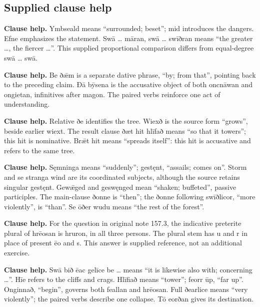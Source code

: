 \subsection*{Supplied clause help}

\textbf{Clause help.} Ymbseald means “surrounded; beset”; mid introduces the dangers. Efne emphasizes the statement. Swā … māran, swā … swīðran means “the greater …, the fiercer …”. This supplied proportional comparison differs from equal-degree swā … swā.

\textbf{Clause help.} Be ðǣm is a separate dative phrase, “by; from that”, pointing back to the preceding claim. Ðā bȳsena is the accusative object of both oncnāwan and ongietan, infinitives after magon. The paired verbs reinforce one act of understanding.

\textbf{Clause help.} Relative ðe identifies the tree. Wiexð is the source form “grows”, beside earlier wiext. The result clause ðæt hit hlīfað means “so that it towers”; this hit is nominative. Brǣt hit means “spreads itself”: this hit is accusative and refers to the same tree.

\textbf{Clause help.} Sęmninga means “suddenly”; gestęnt, “assails; comes on”. Storm and se stranga wind are its coordinated subjects, although the source retains singular gestęnt. Gewǣged and geswęnged mean “shaken; buffeted”, passive participles. The main-clause ðonne is “then”; the ðonne following swīðlicor, “more violently”, is “than”. Se ōðer wudu means “the rest of the forest”.

\textbf{Clause help.} For the question in original note 157.3, the indicative preterite plural of hrēosan is hruron, in all three persons. The plural stem has u and r in place of present ēo and s. This answer is supplied reference, not an additional exercise.

\textbf{Clause help.} Swā bið ēac gelīce be … means “it is likewise also with; concerning …”. Hīe refers to the cliffs and crags. Hlīfiað means “tower”; feorr ūp, “far up”. Onginnað, “begin”, governs both feallan and hrēosan. Full ðearlice means “very violently”; the paired verbs describe one collapse. Tō eorðan gives its destination.

